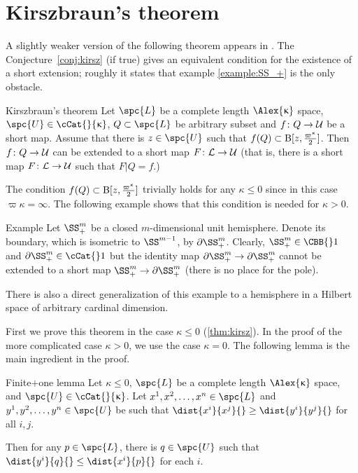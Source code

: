 \section{Kirszbraun's theorem}\label{sec:kirszbraun}

A slightly weaker version of the following theorem
appears in \cite{lang-schroeder}.
The Conjecture~\ref{conj:kirsz} (if true) gives an equivalent condition for the existence of a short extension;
roughly it states that example \ref{example:SS_+} is the only obstacle.

\begin{thm}{Kirszbraun's theorem}
\label{thm:kirsz+}
Let
$\spc{L}$ be a complete length $\Alex{\kappa}$ space, 
$\spc{U}\in\cCat{}{\kappa}$, 
$Q\subset \spc{L}$ be arbitrary subset
and $f\: Q\to\spc{U}$ be a short map.
Assume that there is $z\in\spc{U}$ such that 
$f(Q)\subset \oBall[z,\tfrac{\varpi\kappa}{2}]$.
Then $f\:Q\to\spc{U}$ can be extended to a short map 
$F\:\spc{L}\to \spc{U}$
(that is, there is a short map $F\:\spc{L}\to \spc{U}$ such that $F|Q=f$.)
\end{thm}
 
The condition $f(Q)\subset \oBall[z,\tfrac{\varpi\kappa}{2}]$ trivially holds for any $\kappa\le 0$ since in this case $\varpi\kappa=\infty$. 
The following example shows that this condition is needed for $\kappa>0$.

\begin{thm}{Example}\label{example:SS_+}
Let $\SS^m_+$ be a closed $m$-dimensional unit hemisphere.  Denote its boundary, which is isometric to $\SS^{m-1}$, by  $\partial\SS^m_+$.
Clearly, $\SS^m_+\in\CBB{}1$ and $\partial\SS^m_+\in\cCat{}1$ but the identity map ${\partial\SS^m_+}\to \partial\SS^m_+$ cannot be extended to a short map $\SS^m_+\to \partial\SS^m_+$ (there is no place for the pole).

There is also a direct generalization of this example to a hemisphere in a Hilbert space of arbitrary cardinal dimension.
\end{thm}

First we prove this theorem in the case $\kappa\le 0$ (\ref{thm:kirsz}).
In the proof of the more complicated case $\kappa>0$, we use the case $\kappa=0$.
The following lemma is the main ingredient in the proof. 

\begin{thm}{Finite$\bm{+}$one lemma}\label{lem:kirsz-neg:new}
Let $\kappa\le 0$,
$\spc{L}$ be a complete length $\Alex{\kappa}$ space, and 
$\spc{U}\in\cCat{}{\kappa}$.  Let  
$x^1,x^2,\dots,x^n\in\spc{L}$ 
and $y^1,y^2,\dots,y^n\in\spc{U}$
be
such that $\dist{x^i}{x^j}{}\ge\dist{y^i}{y^j}{}$ for all $i,j$.

Then for any $p\in\spc{L}$, there is $q\in\spc{U}$ such that $\dist{y^i}{q}{}\le\dist{x^i}{p}{}$ for each $i$.
\end{thm}


